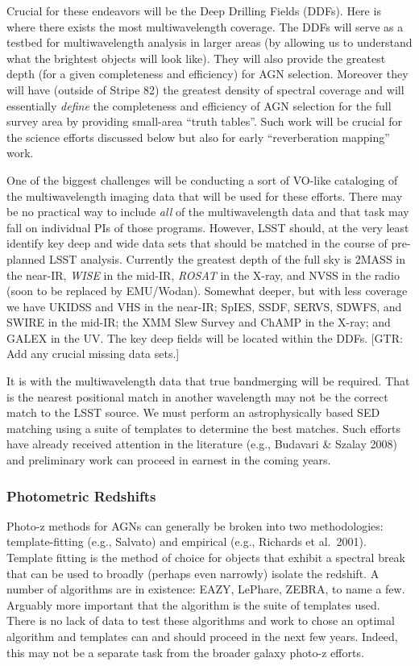 Crucial for these endeavors will be the Deep Drilling Fields (DDFs).  Here is where there exists the most multiwavelength coverage.  The DDFs will serve as a testbed for multiwavelength analysis in larger areas (by allowing us to understand what the brightest objects will look like).  They will also provide the greatest depth (for a given completeness and efficiency) for AGN selection.  Moreover they will have (outside of Stripe 82) the greatest density of spectral coverage and will essentially {\em define} the completeness and efficiency of AGN selection for the full survey area by providing small-area ``truth tables''.  Such work will be crucial for the science efforts discussed below but also for early ``reverberation mapping'' work.

One of the biggest challenges will be conducting a sort of VO-like cataloging of the multiwavelength imaging data that will be used for these efforts.  There may be no practical way to include {\em all} of the multiwavelength data and that task may fall on individual PIs of those programs.  However, LSST should, at the very least identify key deep and wide data sets that should be matched in the course of pre-planned LSST analysis.  Currently the greatest depth of the full sky is 2MASS in the near-IR, {\em WISE} in the mid-IR, {\em ROSAT} in the X-ray, and NVSS in the radio (soon to be replaced by EMU/Wodan).  Somewhat deeper, but with less coverage we have UKIDSS and VHS in the near-IR; SpIES, SSDF, SERVS, SDWFS, and SWIRE in the mid-IR; the XMM Slew Survey and ChAMP in the X-ray; and GALEX in the UV.   The key deep fields will be located within the DDFs.  [GTR: Add any crucial missing data sets.]

It is with the multiwavelength data that true bandmerging will be required.  That is the nearest positional match in another wavelength may not be the correct match to the LSST source.  We must perform an astrophysically based SED matching using a suite of templates to determine the best matches.  Such efforts have already received attention in the literature (e.g., Budavari \& Szalay 2008) and preliminary work can proceed in earnest in the coming years.

\subsubsection{Photometric Redshifts}

Photo-z methods for AGNs can generally be broken into two methodologies: template-fitting (e.g., Salvato) and empirical (e.g., Richards et al.\ 2001).  Template fitting is the method of choice for objects that exhibit a spectral break that can be used to broadly (perhaps even narrowly) isolate the redshift.   A number of algorithms are in existence: EAZY, LePhare, ZEBRA, to name a few.  Arguably more important that the algorithm is the suite of templates used.   There is no lack of data to test these algorithms and work to chose an optimal algorithm and templates can and should proceed in the next few years.  Indeed, this may not be a separate task from the broader galaxy photo-z efforts.

